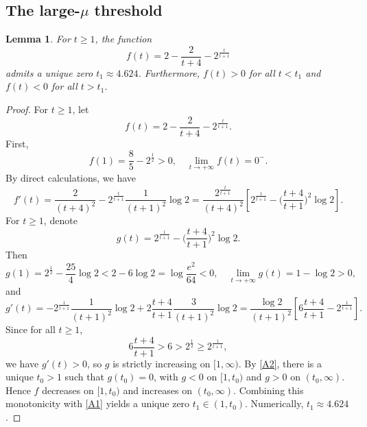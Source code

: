 \documentclass[11pt]{article}
\newtheorem{lemma}{Lemma}[section]
\begin{document}
\subsection{\texorpdfstring{{The large-$\mu$ threshold}}{The large-mu threshold}}
\begin{lemma}\label{num}
For $t\geq1$, the function
\begin{equation*}
f(t)=2-\frac{2}{t+4}-2^{\frac{t}{t+1}}
\end{equation*}
admits a unique zero $t_1\approx {4.624}$. Furthermore, $f(t)>0$ for all $t<t_1$ and $f(t)<0$ for all $t>t_1$.
\end{lemma}
\begin{proof}
For $t\geq1$, let
\begin{equation*}
f(t)=2-\frac{2}{t+4}-2^{\frac{t}{t+1}}.
\end{equation*}
 {First,}
\begin{equation}\label{A1}
 f(1)=\frac{8}{5}-2^{\frac{1}{2}}>0,\quad
 \lim\limits_{t\rightarrow+\infty}f(t)=0^-.
\end{equation}
By direct calculations, we have
\begin{equation*}
 f'(t)=\frac{2}{(t+4)^2}-2^{\frac{t}{t+1}}\frac{1}{(t+1)^2}\log 2=\frac{2^{\frac{t}{t+1}}}{(t+4)^2}\left[2^{\frac{1}{t+1}}-\bigg(\frac{t+4}{t+1}\bigg)^2\log 2\right].
\end{equation*}
For $t\geq1$, denote
\begin{equation*}
g(t)=2^{\frac{1}{t+1}}-\bigg(\frac{t+4}{t+1}\bigg)^2\log 2.
\end{equation*}
 Then
\begin{equation}\label{A2}
 g(1)=2^{\frac{1}{2}}-\frac{25}{4}\log 2<2-6\log 2=\log \frac{e^2}{64}<0,\quad \lim\limits_{t\rightarrow+\infty}g(t)=1-\log2>0,
\end{equation}
and
\begin{equation*}
 g'(t)=-2^{\frac{1}{t+1}}\frac{1}{(t+1)^2}\log 2+2\frac{t+4}{t+1}\frac{3}{(t+1)^2}\log 2=\frac{\log 2}{(t+1)^2}\left[6\frac{t+4}{t+1}-2^{\frac{1}{t+1}}\right].
\end{equation*}
Since for all $t\geq1$,
\begin{equation*}
 6\frac{t+4}{t+1}>6>2^{\frac{1}{2}}\geq2^{\frac{1}{t+1}},
\end{equation*}
{we have $g'(t)>0$, so $g$ is strictly increasing on $[1,\infty)$. By \eqref{A2}, there is a unique $t_0>1$ such that $g(t_0)=0$, with $g<0$ on $[1,t_0)$ and $g>0$ on $(t_0,\infty)$. Hence $f$ decreases on $[1,t_0)$ and increases on $(t_0,\infty)$. Combining this monotonicity with \eqref{A1} yields a unique zero $t_1\in(1,t_0)$. Numerically, $t_1\approx{4.624}$.}
\end{proof}
\end{document}
